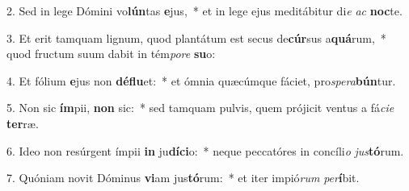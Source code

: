 2. Sed in lege Dómini vo\textbf{lún}tas \textbf{e}jus,~*  et in lege ejus meditábitur di\textit{e} \textit{ac} \textbf{noc}te.\

3. Et erit tamquam lignum, quod plantátum est secus de\textbf{cúr}sus a\textbf{quá}rum,~*  quod fructum suum dabit in tém\textit{po}\textit{re} \textbf{su}o:\

4. Et fólium \textbf{e}jus non \textbf{dé}\textbf{flu}et:~*  et ómnia quæcúmque fáciet, pro\textit{spe}\textit{ra}\textbf{bún}tur.\

5. Non sic \textbf{ím}pii, \textbf{non} sic:~*  sed tamquam pulvis, quem prójicit ventus a fá\textit{ci}\textit{e} \textbf{ter}ræ.\

6. Ideo non resúrgent ímpii \textbf{in} ju\textbf{dí}\textbf{ci}o:~*  neque peccatóres in concíli\textit{o} \textit{jus}\textbf{tó}rum.\

7. Quóniam novit Dóminus \textbf{vi}am jus\textbf{tó}rum:~*  et iter impió\textit{rum} \textit{per}\textbf{í}bit.\

